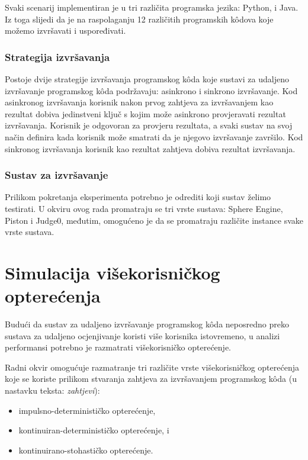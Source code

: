 \documentclass[times, utf8, diplomski]{fer}
\begin{document}
Svaki scenarij implementiran je u tri različita programska jezika: Python,  i Java. Iz toga slijedi da je na raspolaganju 12 različitih programskih kôdova koje možemo izvršavati i uspoređivati.

\subsubsection{Strategija izvršavanja}
Postoje dvije strategije izvršavanja programskog kôda koje sustavi za udaljeno izvršavanje programskog kôda podržavaju: asinkrono i sinkrono izvršavanje. Kod asinkronog izvršavanja korisnik nakon prvog zahtjeva za izvršavanjem kao rezultat dobiva jedinstveni ključ  s kojim može asinkrono provjeravati rezultat izvršavanja. Korisnik je odgovoran za provjeru rezultata, a svaki sustav na svoj način definira kada korisnik može smatrati da je njegovo izvršavanje završilo. Kod sinkronog izvršavanja korisnik kao rezultat zahtjeva dobiva rezultat izvršavanja.

\subsubsection{Sustav za izvršavanje}
Prilikom pokretanja eksperimenta potrebno je odrediti koji sustav želimo testirati. U okviru ovog rada promatraju se tri vrste sustava: Sphere Engine, Piston i Judge0, međutim, omogućeno je da se promatraju različite instance svake vrste sustava.

\section{Simulacija višekorisničkog opterećenja}
Budući da sustav za udaljeno izvršavanje programskog kôda neposredno preko sustava za udaljeno ocjenjivanje koristi više korisnika istovremeno, u analizi performansi potrebno je razmatrati višekorisničko opterećenje.

Radni okvir omogućuje razmatranje tri različite vrste višekorisničkog opterećenja koje se koriste prilikom stvaranja zahtjeva za izvršavanjem programskog kôda (u nastavku teksta: \textit{zahtjevi}):
\begin{itemize}
    \item impulsno-determinističko opterećenje,
    \item kontinuiran-determinističko opterećenje, i
    \item kontinuirano-stohastičko opterećenje.
\end{itemize}
\end{document}
